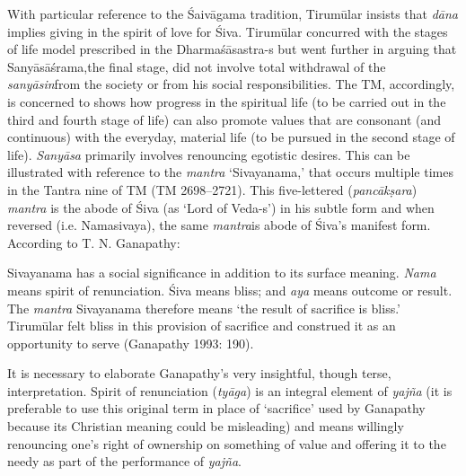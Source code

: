 With particular reference to the Śaivāgama tradition, Tirumūlar insists that \textit{dāna} implies giving in the spirit of love for Śiva. Tirumūlar concurred with the stages of life model prescribed in the Dharmaśāsastra-s but went further in arguing that Sanyāsāśrama,\break the final stage, did not involve total withdrawal of the \textit{sanyāsin}from the society or from his social responsibilities. The TM, accordingly, is concerned to shows how progress in the spiritual life (to be carried out in the third and fourth stage of life) can also promote values that are consonant (and continuous) with the everyday, material life (to be pursued in the second stage of life). \textit{Sanyāsa} primarily involves renouncing egotistic desires. This can be illustrated with reference to the \textit{mantra} ‘Sivayanama,’ that occurs multiple times in the Tantra nine of TM (TM 2698–2721). This five-lettered (\textit{pancākṣara}) \textit{mantra} is the abode of Śiva (as ‘Lord of Veda-s’) in his subtle form and when reversed (i.e. Namasivaya), the same \textit{mantra}is abode of Śiva’s manifest form. According to T. N. Ganapathy:

\begin{myquote}
Sivayanama has a social significance in addition to its surface meaning. \textit{Nama} means spirit of renunciation. Śiva means bliss; and \textit{aya} means outcome or result. The \textit{mantra} Sivayanama therefore means ‘the result of sacrifice is bliss.’ Tirumūlar felt bliss in this provision of sacrifice and construed it as an opportunity to serve (Ganapathy 1993: 190).
\end{myquote}

It is necessary to elaborate Ganapathy’s very insightful, though terse, interpretation. Spirit of renunciation (\textit{tyāga}) is an integral element of \textit{yajña} (it is preferable to use this original term in place of ‘sacrifice’ used by Ganapathy because its Christian meaning could be misleading) and means willingly renouncing one’s right of ownership on something of value and offering it to the needy as part of the performance of \textit{yajña}.

